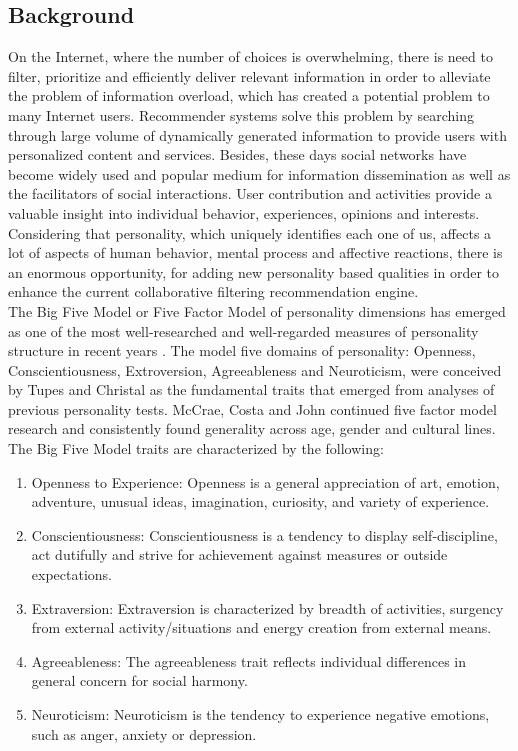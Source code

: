 \documentclass[journal]{IEEEtran}
\begin{document}
\subsection{Background}
On the Internet, where the number of choices is overwhelming, there is need to filter, prioritize and efficiently deliver relevant information in order to alleviate the problem of information overload, which has created a potential problem to many Internet users. Recommender systems solve this problem by searching through large volume of dynamically generated information to provide users with personalized content and services. Besides, these days social networks have become widely used and popular medium for information dissemination as well as the facilitators of social interactions. User contribution and activities provide a valuable insight into individual behavior, experiences, opinions and interests. Considering that personality, which uniquely identifies each one of us, affects a lot of aspects of human behavior, mental process and affective reactions, there is an enormous opportunity, for adding new personality based qualities in order to enhance the current collaborative filtering recommendation engine.\\
The Big Five Model or Five Factor Model of personality dimensions has emerged as one of the most well-researched and well-regarded measures of personality structure in recent years \cite{fivefactormodel}. The model five domains of personality: Openness, Conscientiousness, Extroversion, Agreeableness and Neuroticism, were conceived by Tupes and Christal \cite{tupes} as the fundamental traits that emerged from analyses of previous personality tests. McCrae, Costa and John \cite{mccrae} continued five factor model research and consistently found generality across age, gender and cultural lines.
The Big Five Model traits are characterized by the following:
\begin{enumerate}
\item Openness to Experience: Openness is a general appreciation of art, emotion, adventure, unusual ideas, imagination, curiosity, and variety of experience.
\item Conscientiousness: Conscientiousness is a tendency to display self-discipline, act dutifully and strive for achievement against measures or outside expectations.
\item Extraversion: Extraversion is characterized by breadth of activities, surgency from external activity/situations and energy creation from external means.
\item Agreeableness: The agreeableness trait reflects individual differences in general concern for social harmony.
\item Neuroticism: Neuroticism is the tendency to experience negative emotions, such as anger, anxiety or depression.
\end{enumerate}
\end{document}
